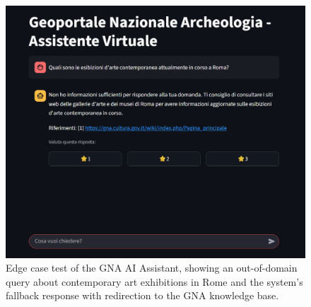 \begin{spacing}{1.5}
\vspace{0.5em}
\begin{figure}[H]
  \centering
  \includegraphics[width=\textwidth]{images/edge_case_response.png} 
  \caption{Edge case test of the GNA AI Assistant, showing an out-of-domain query about contemporary art exhibitions in Rome and the system’s fallback response with redirection to the GNA knowledge base.}
  \label{fig:edge-case}
\end{figure}


\end{spacing}